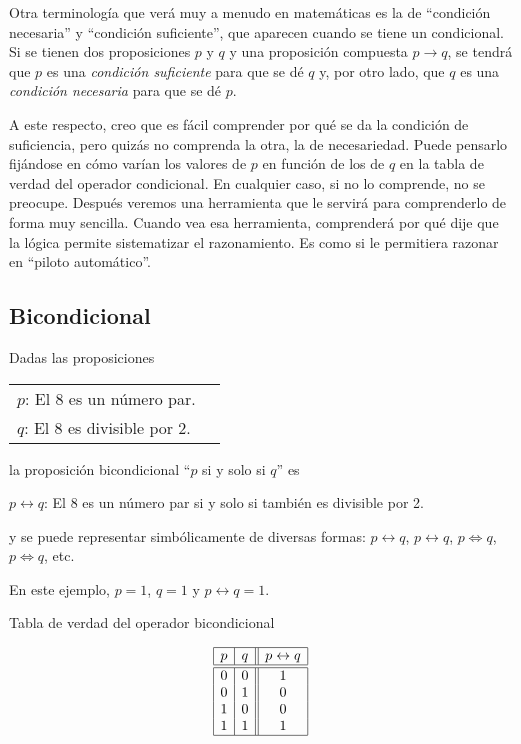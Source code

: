 Otra terminología que verá muy a menudo en matemáticas es la de ``condición
necesaria'' y ``condición suficiente'', que aparecen cuando se tiene un
condicional. Si se tienen dos proposiciones $p$ y $q$ y una proposición
compuesta $p \to q$, se tendrá que $p$ es una \emph{condición suficiente}
para que se dé $q$ y, por otro lado, que $q$ es una \emph{condición
necesaria} para que se dé $p$.

A este respecto, creo que es fácil comprender por qué se da la condición de
suficiencia, pero quizás no comprenda la otra, la de necesariedad. Puede
pensarlo fijándose en cómo varían los valores de $p$ en función de los de
$q$ en la tabla de verdad del operador condicional. En cualquier caso, si no
lo comprende, no se preocupe. Después veremos una herramienta que le servirá
para comprenderlo de forma muy sencilla. Cuando vea esa herramienta,
comprenderá por qué dije que la lógica permite sistematizar el razonamiento.
Es como si le permitiera razonar en ``piloto automático''.






\subsection{Bicondicional}

Dadas las proposiciones

\begin{center}
\begin{tabular}{l l}
  $p$: El 8 es un número par. \\
  $q$: El 8 es divisible por 2.
\end{tabular}
\end{center}

\noindent la proposición bicondicional ``$p$ si y solo si $q$'' es

\begin{center}
  $p \leftrightarrow q$: El 8 es un número par si y solo si también es
  divisible por 2.
\end{center}

\noindent y se puede representar simbólicamente de diversas formas: $p
\longleftrightarrow q$, $p \leftrightarrow q$, $p \Leftrightarrow q$, $p
\iff q$, etc.

En este ejemplo, $p = 1$, $q = 1$ y $p \leftrightarrow q = 1$.

\begin{table}[h]%
  \caption{Tabla de verdad del operador bicondicional}
  \label{tbl:operador-bicondicional}%
  \centering
  $$
    \begin{array}{|c|c||c|}
      \hline
      p & q & p \leftrightarrow q \\
      \hline
      \hline
      0 & 0 & 1 \\
      0 & 1 & 0 \\
      1 & 0 & 0 \\
      1 & 1 & 1 \\
      \hline
    \end{array}
  $$
\end{table}

